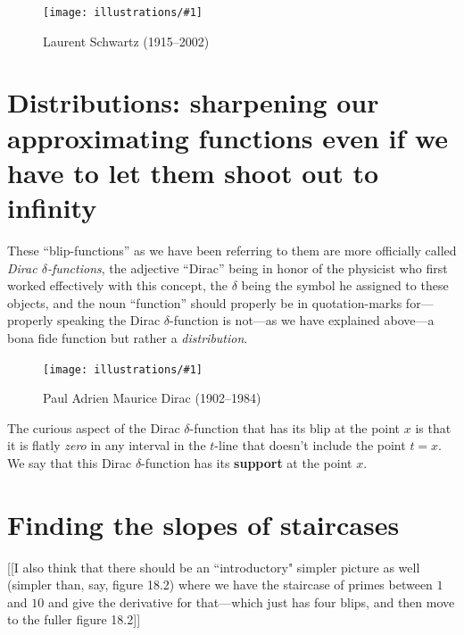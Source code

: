 \documentclass[11pt]{article}
\newcommand{\ill}[3]{ 
   \begin{figure}[H]
   \begin{center}
   \texttt{[image: illustrations/\#1]}
   \caption{#3}
   \end{center}
    \end{figure}
}
\theoremstyle{plain}
\theoremstyle{definition}
\numberwithin{equation}{section}
\numberwithin{figure}{section}
\numberwithin{table}{section}
\begin{document}
 \ill{schwartz}{.2}{Laurent Schwartz (1915--2002)} 



\section{Distributions: sharpening our approximating functions even if
  we have to let them shoot out to infinity}
These ``blip-functions'' as we have been referring to them are more
officially called {\em Dirac $\delta$-functions}, the adjective
``Dirac'' being in honor of the physicist who first worked effectively
with this concept, the $\delta$ being the symbol he assigned to these
objects, and the noun ``function'' should properly be in
quotation-marks for---properly speaking the Dirac $\delta$-function is
not---as we have explained above---a bona fide function but rather a
{\em distribution}.

\ill{dirac}{0.2}{Paul Adrien Maurice Dirac (1902--1984)}

   The curious aspect of the Dirac $\delta$-function that has its blip
   at the point $x$ is that it is flatly {\em zero} in any interval in
   the $t$-line that doesn't include the point $t=x$.  We say that
   this Dirac $\delta$-function has its {\bf support} at the point $x$.


\section{Finding the slopes of staircases} 

[[I also think that there should be an ``introductory" simpler picture
as well (simpler than, say, figure 18.2) where we have the staircase
of primes between $1$ and $10$ and give the derivative for
that---which just has four blips, and then move to the fuller figure
18.2]]
\end{document}

